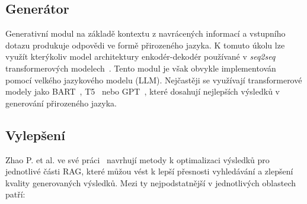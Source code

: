 \subsection{Generátor}
Generativní modul na základě kontextu z navrácených informací a vstupního dotazu produkuje odpovědi ve formě přirozeného jazyka. K tomuto úkolu lze využít kterýkoliv model architektury enkodér-dekodér používané v \textit{seq2seq} transformerových modelech~\cite{murel2024encoderdecoder}. Tento modul je však obvykle implementován pomocí velkého jazykového modelu (LLM). Nejčastěji se využívají transformerové modely jako BART~\cite{lewis2019bart}, T5~\cite{raffel2020T5} nebo GPT~\cite{gpt}, které dosahují nejlepších výsledků v generování přirozeného jazyka.

\subsection{Vylepšení}
Zhao P. et al. ve své práci~\cite{rag_for_aigc} navrhují metody k optimalizaci výsledků pro jednotlivé části RAG, které můžou vést k lepší přesnosti vyhledávání a zlepšení kvality generovaných výsledků. Mezi ty nejpodstatnější v jednotlivých oblastech patří:

